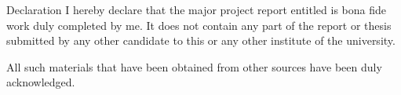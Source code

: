 \begin{letterheadpage}{Declaration}
    \noindent I hereby declare that the major project report entitled \textbf{\textit{\docTitle}} is bona fide work duly completed by me. It does not contain any part of the report or thesis submitted by any other candidate to this or any other institute of the university.

    All such materials that have been obtained from other sources have been duly acknowledged.


    \studentDeclareSign

\end{letterheadpage}
